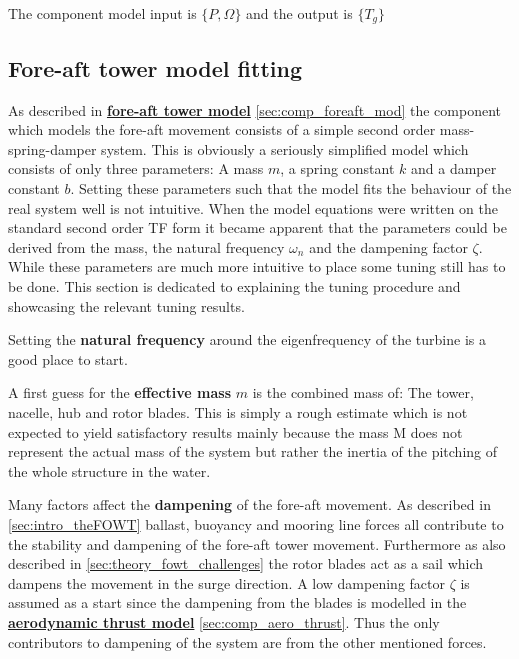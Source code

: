 The component model input is $ \{P, \Omega\} $ and the output is $ \{T_g\} $



\subsection{Fore-aft tower model fitting} \label{sec:app_mod_foreaft_fitting}
As described in \hyperref[sec:comp_foreaft_mod]{\textbf{fore-aft tower model}} \cref{sec:comp_foreaft_mod} the component which models the fore-aft movement consists of a simple second order mass-spring-damper system. This is obviously a seriously simplified model which consists of only three parameters: A mass $ m $, a spring constant $ k $ and a damper constant $ b $. Setting these parameters such that the model fits the behaviour of the real system well is not intuitive. When the model equations were written on the standard second order TF form it became apparent that the parameters could be derived from the mass, the natural frequency $ \omega_n $ and the dampening factor $ \zeta $. While these parameters are much more intuitive to place some tuning still has to be done. This section is dedicated to explaining the tuning procedure and showcasing the relevant tuning results.

\medskip
\noindent Setting the \textbf{natural frequency} around the eigenfrequency of the turbine is a good place to start.

\smallskip
\noindent A first guess for the \textbf{effective mass} $ m $ is the combined mass of: The tower, nacelle, hub and rotor blades. This is simply a rough estimate which is not expected to yield satisfactory results mainly because the mass M does not represent the actual mass of the system but rather the inertia of the pitching of the whole structure in the water. 

\smallskip
\noindent Many factors affect the \textbf{dampening} of the fore-aft movement. As described in \cref{sec:intro_theFOWT} ballast, buoyancy and mooring line forces all contribute to the stability and dampening of the fore-aft tower movement. Furthermore as also described in \cref{sec:theory_fowt_challenges} the rotor blades act as a sail which dampens the movement in the surge direction. A low dampening factor $ \zeta $ is assumed as a start since the dampening from the blades is modelled in the \hyperref[sec:comp_aero_thrust]{\textbf{aerodynamic thrust model}} \cref{sec:comp_aero_thrust}. Thus the only contributors to dampening of the system are from the other mentioned forces.

